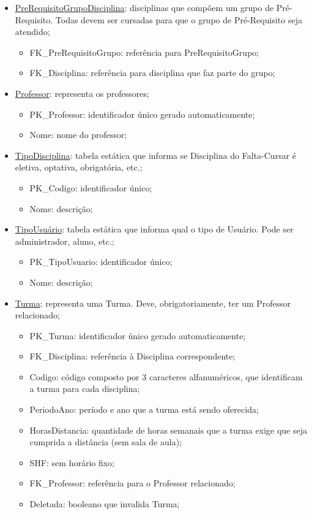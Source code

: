 \documentclass[graduacao,brazil]{ThesisPUC}
\begin{document}
\begin{itemize}
	\item \underline{PreRequisitoGrupoDisciplina}: disciplinas que compõem um grupo de Pré-Requisito. Todas devem ser cursadas para que o grupo de Pré-Requisito seja atendido;
	\begin{itemize}
		\item FK\_PreRequisitoGrupo: referência para PreRequisitoGrupo;
		\item FK\_Disciplina: referência para disciplina que faz parte do grupo;
	\end{itemize}

	\item \underline{Professor}: representa os professores;
	\begin{itemize}
		\item PK\_Professor: identificador único gerado automaticamente;
		\item Nome: nome do professor;
	\end{itemize}

	\item \underline{TipoDisciplina}: tabela estática que informa se Disciplina do Falta-Cursar é eletiva, optativa, obrigatória, etc.;
	\begin{itemize}
		\item PK\_Codigo: identificador único;
		\item Nome: descrição;
	\end{itemize}

	\item \underline{TipoUsuário}: tabela estática que informa qual o tipo de Usuário. Pode ser administrador, aluno, etc.;
	\begin{itemize}
		\item PK\_TipoUsuario: identificador único;
		\item Nome: descrição;
	\end{itemize}

	\item \underline{Turma}: representa uma Turma. Deve, obrigatoriamente, ter um Professor relacionado;
	\begin{itemize}
		\item PK\_Turma: identificador único gerado automaticamente;
		\item FK\_Disciplina: referência à Disciplina correspondente;
		\item Codigo: código composto por 3 caracteres alfanuméricos, que identificam a turma para cada disciplina;
		\item PeriodoAno: período e ano que a turma está sendo oferecida;
		\item HorasDistancia: quantidade de horas semanais que a turma exige que seja cumprida a distância (sem sala de aula);
		\item SHF: sem horário fixo;
		\item FK\_Professor: referência para o Professor relacionado;
		\item Deletada: booleano que invalida Turma;
	\end{itemize}


\end{itemize}
\end{document}
